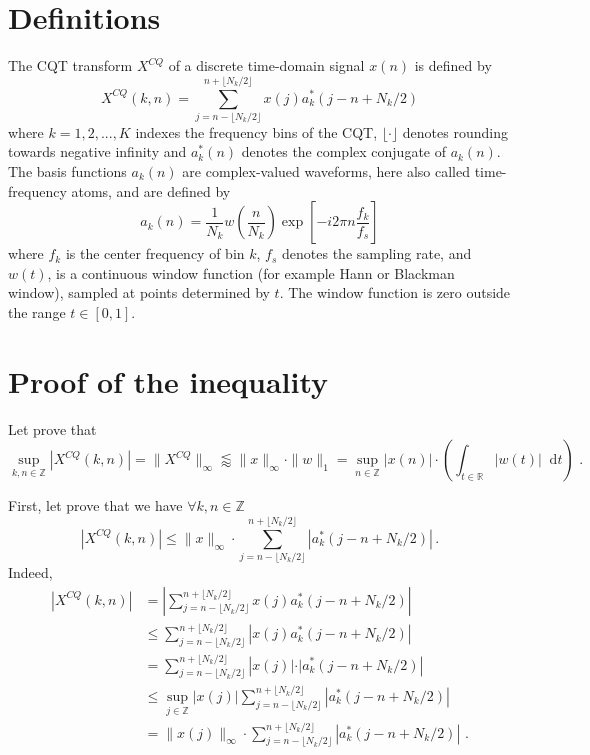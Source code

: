 \documentclass[12pt]{article}
\newcommand*\diff{\mathop{}\!\mathrm{d}}
\begin{document}
\section{Definitions}
The CQT transform $X^{CQ}$ of a discrete time-domain
signal $x(n)$ is defined by
\begin{equation}
X^{CQ}(k,n) = \sum_{j=n-\lfloor N_k / 2 \rfloor}^{n+\lfloor N_k / 2 \rfloor} x(j) a_k^{*}(j-n+N_k/2)
\end{equation}
where $k = 1, 2, . . . , K$ indexes the frequency bins of the
CQT, $\lfloor \cdot \rfloor$ denotes rounding towards negative infinity and
$a_k^{*}(n)$ denotes the complex conjugate of $a_k(n)$. The basis
functions $a_k(n)$ are complex-valued waveforms, here also
called time-frequency atoms, and are defined by
\begin{equation}
a_k(n) = \frac{1}{N_k} w(\frac{n}{N_k})\exp\left[- i 2 \pi n \frac{f_k}{f_s}\right]
\end{equation}
where $f_k$ is the center frequency of bin $k$, $f_s$ denotes the sampling rate, and $w(t)$, is a continuous window function (for example Hann or Blackman window), sampled at points determined by $t$. The window function is zero outside the range $t \in [0, 1]$.

\section{Proof of the inequality}
Let prove that 
\begin{equation}
\sup_{k, n \in \mathbb{Z}} |X^{CQ}(k,n)| = \| X^{CQ} \|_{\infty} \lessapprox \| x \|_{\infty} \cdot \| w \|_1  = \sup_{n \in \mathbb{Z}} |x(n)| \cdot   \left( \int_{t\in \mathbb{R}} |w(t)| \diff t \right) \, \, . 
\end{equation} 

First, let prove that we have $\forall k,n\in \mathbb{Z}$
\begin{equation}\label{inequality}
|X^{CQ}(k,n)| \leq \| x \|_{\infty} \cdot \sum_{j=n-\lfloor N_k / 2 \rfloor}^{n+\lfloor N_k / 2 \rfloor} |a_k^{*}(j-n+N_k/2) | \, .
\end{equation}
Indeed,
\begin{align*}
|X^{CQ}(k,n)| &= \left|\sum_{j=n-\lfloor N_k / 2 \rfloor}^{n+\lfloor N_k / 2 \rfloor} x(j) a_k^{*}(j-n+N_k/2) \right| \\
&\leq \sum_{j=n-\lfloor N_k / 2 \rfloor}^{n+\lfloor N_k / 2 \rfloor} \left| x(j) a_k^{*}(j-n+N_k/2) \right| \\
&= \sum_{j=n-\lfloor N_k / 2 \rfloor}^{n+\lfloor N_k / 2 \rfloor} \left| x(j) | \cdot |a_k^{*}(j-n+N_k/2) \right| \\
&\leq \sup_{j \in \mathbb{Z}} | x(j) | \sum_{j=n-\lfloor N_k / 2 \rfloor}^{n+\lfloor N_k / 2 \rfloor} |a_k^{*}(j-n+N_k/2) | \\
&= \| x(j) \|_{\infty} \cdot \sum_{j=n-\lfloor N_k / 2 \rfloor}^{n+\lfloor N_k / 2 \rfloor} |a_k^{*}(j-n+N_k/2) | \, \, .
\end{align*} 
\end{document}
